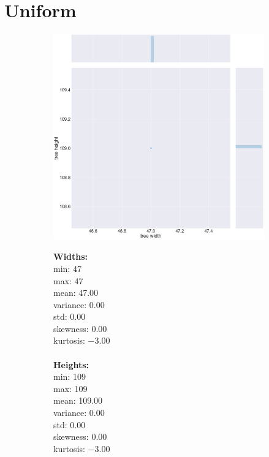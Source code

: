 \label{appendix:data}
\section{Uniform}
\label{appendix:data:uniform}
\begin{figure}[H]
\centering
\begin{subfigure}{.8\textwidth}
	\includegraphics[width=.9\textwidth]{img/0_UNIFORM_plot.png}
\end{subfigure}%
\begin{subfigure}{.2\textwidth}
  \centering
  \begin{minipage}{1\textwidth}
\textbf{Widths:}
\\
min: 47
\\
max: 47
\\
mean: 47.00
\\
variance: 0.00
\\
std: 0.00
\\
skewness: 0.00
\\
kurtosis: $-3.00$
\\\\
\textbf{Heights:}
\\
min: 109
\\
max: 109
\\
mean: 109.00
\\
variance: 0.00
\\
std: 0.00
\\
skewness: 0.00
\\
kurtosis: $-3.00$
  \end{minipage}
\end{subfigure}
\end{figure}
